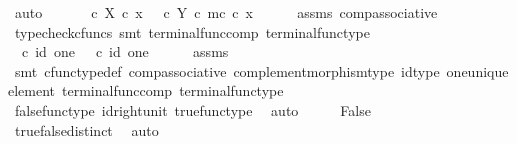 \begin{isabellebody}
\ auto\isanewline
\ \ \isamarkupfalse%
\ \isamarkupfalse%
\ {\isachardoublequoteopen}{\isasymt}\ {\isasymcirc}\isactrlsub c\ {\isasymbeta}\isactrlbsub X\isactrlesub \ {\isasymcirc}\isactrlsub c\ x\ {\isacharequal}{\kern0pt}\ {\isasymf}\ {\isasymcirc}\isactrlsub c\ {\isasymbeta}\isactrlbsub Y\isactrlesub \ {\isasymcirc}\isactrlsub c\ m\isactrlsup c\ {\isasymcirc}\isactrlsub c\ x{\isacharprime}{\kern0pt}{\isachardoublequoteclose}\isanewline
\ \ \ \ \isamarkupfalse%
\ assms\ comp{\isacharunderscore}{\kern0pt}associative{}\ \isamarkupfalse%
\ {\isacharparenleft}{\kern0pt}typecheck{\isacharunderscore}{\kern0pt}cfuncs{\isacharcomma}{\kern0pt}\ smt\ terminal{\isacharunderscore}{\kern0pt}func{\isacharunderscore}{\kern0pt}comp\ terminal{\isacharunderscore}{\kern0pt}func{\isacharunderscore}{\kern0pt}type{\isacharparenright}{\kern0pt}\isanewline
\ \ \isamarkupfalse%
\ \isamarkupfalse%
\ {\isachardoublequoteopen}{\isasymt}\ {\isasymcirc}\isactrlsub c\ id\ one\ {\isacharequal}{\kern0pt}\ {\isasymf}\ {\isasymcirc}\isactrlsub c\ id\ one{\isachardoublequoteclose}\isanewline
\ \ \ \ \isamarkupfalse%
\ assms\ \isamarkupfalse%
\ {\isacharparenleft}{\kern0pt}smt\ cfunc{\isacharunderscore}{\kern0pt}type{\isacharunderscore}{\kern0pt}def\ comp{\isacharunderscore}{\kern0pt}associative\ complement{\isacharunderscore}{\kern0pt}morphism{\isacharunderscore}{\kern0pt}type\ id{\isacharunderscore}{\kern0pt}type\ one{\isacharunderscore}{\kern0pt}unique{\isacharunderscore}{\kern0pt}element\ terminal{\isacharunderscore}{\kern0pt}func{\isacharunderscore}{\kern0pt}comp\ terminal{\isacharunderscore}{\kern0pt}func{\isacharunderscore}{\kern0pt}type{\isacharparenright}{\kern0pt}\isanewline
\ \ \isamarkupfalse%
\ \isamarkupfalse%
\ {\isachardoublequoteopen}{\isasymt}\ {\isacharequal}{\kern0pt}\ {\isasymf}{\isachardoublequoteclose}\isanewline
\ \ \ \ \isamarkupfalse%
\ false{\isacharunderscore}{\kern0pt}func{\isacharunderscore}{\kern0pt}type\ id{\isacharunderscore}{\kern0pt}right{\isacharunderscore}{\kern0pt}unit{}\ true{\isacharunderscore}{\kern0pt}func{\isacharunderscore}{\kern0pt}type\ \isamarkupfalse%
\ auto\isanewline
\ \ \isamarkupfalse%
\ \isamarkupfalse%
\ False\isanewline
\ \ \ \ \isamarkupfalse%
\ true{\isacharunderscore}{\kern0pt}false{\isacharunderscore}{\kern0pt}distinct\ \isamarkupfalse%
\ auto\isanewline

\end{isabellebody}
